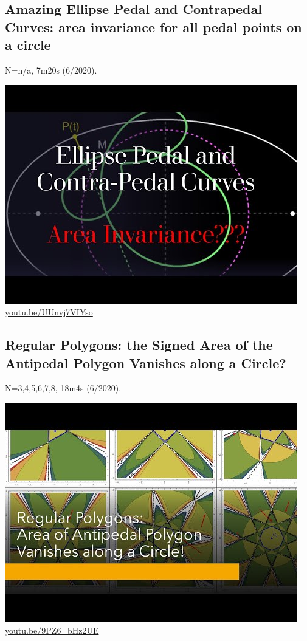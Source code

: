 \documentclass[12pt]{amsart}
\begin{document}
\subsection{Amazing Ellipse Pedal and Contrapedal Curves: area invariance for all pedal points on a circle}
\label{vid:UUnvj7VIYso}
\noindent N=n/a, 7m20s (6/2020). 
\begin{center}\includegraphics[width=.5\textwidth]{pics/UUnvj7VIYso.jpg} \\ 
\href{https://youtu.be/UUnvj7VIYso}{\url{youtu.be/UUnvj7VIYso}}\end{center}
% 

\subsection{Regular Polygons: the Signed Area of the Antipedal Polygon Vanishes along a Circle?}
\label{vid:9PZ6_bHz2UE}
\noindent N=3,4,5,6,7,8, 18m4s (6/2020). 
\begin{center}\includegraphics[width=.5\textwidth]{pics/9PZ6_bHz2UE.jpg} \\ 
\href{https://youtu.be/9PZ6_bHz2UE}{\url{youtu.be/9PZ6\_bHz2UE}}\end{center}
% 
\end{document}
